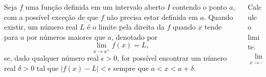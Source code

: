 \begin{frame}
  \begin{columns}[onlytextwidth]
    \begin{column}{0.49\textwidth}\vspace{-0.5cm}
      \begin{definition}
        Seja $f$ uma função definida em um intervalo aberto $I$ contendo o ponto $a$, com a possível exceção de que $f$ não precisa estar definida em $a$. Quando existir, um número real $L$ é o limite pela direita da $f$ quando $x$ tende para $a$ por números maiores que $a$, denotado por 
        \begin{equation*}
          \lim_{x\to a^{+}}{f(x)}=L,
        \end{equation*}
        se, dado qualquer número real $\epsilon>0$, for possível encontrar um número real $\delta>0$ tal que $\left|f\left(x\right)-L\right|<\epsilon$ sempre que $a<x<a+\delta$.
      \end{definition}
    \end{column}
    \begin{column}{0.49\textwidth}\vspace{-0.5cm}
      \begin{example-highlight}
        Calcule o limite.
        \begin{equation*}
          \displaystyle\lim_{x\to -2^{+}}{\sqrt{x+2}}
        \end{equation*}
      \end{example-highlight}
      \begin{figure}
      \end{figure}
    \end{column}
  \end{columns}
\end{frame}

